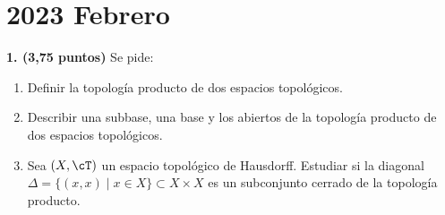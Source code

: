 \chapter*{2023 Febrero}

\begin{enunciado}
    \hypertarget{2023 B 1}{}
    \textbf{1. (3,75 puntos)} Se pide:
    \begin{enumerate}[label=\alph*)]
        \item Definir la topología producto de dos espacios topológicos.
        \item Describir una subbase, una base y los abiertos de la topología producto de dos espacios topológicos.
        \item Sea \((X,\cT)\) un espacio topológico de Hausdorff. Estudiar si la diagonal \(\Delta = \{(x,x) \mid x \in X\} \subset X \times X\) es un subconjunto cerrado de la topología producto.
    \end{enumerate}
\end{enunciado}

